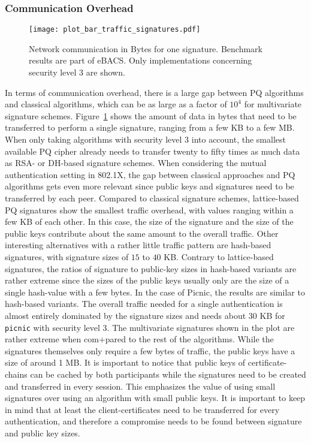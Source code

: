 \subsubsection{Communication Overhead}
\begin{figure}[ht]
    \centering\texttt{[image: plot\_bar\_traffic\_signatures.pdf]}
    \caption{Network communication in Bytes for one signature. Benchmark results are part of eBACS\cite{eBACS}. Only implementations concerning security level 3 are shown.}\label{fig:pq_sig_traffic}
\end{figure}

In terms of communication overhead, there is a large gap between \ac{PQ} algorithms and classical algorithms, which can be as large as a factor of \(10^4\) for multivariate signature schemes. Figure~\ref{fig:pq_sig_traffic} shows the amount of data in bytes that need to be transferred to perform a single signature, ranging from a few KB to a few MB. When only taking algorithms with security level 3 into account, the smallest available \ac{PQ} cipher already needs to transfer twenty to fifty times as much data as RSA- or \ac{DH}-based signature schemes. When considering the mutual authentication setting in 802.1X, the gap between classical approaches and \ac{PQ} algorithms gets even more relevant since public keys and signatures need to be transferred by each peer. Compared to classical signature schemes, lattice-based \ac{PQ} signatures show the smallest traffic overhead, with values ranging within a few KB of each other. In this case, the size of the signature and the size of the public keys contribute about the same amount to the overall traffic. Other interesting alternatives with a rather little traffic pattern are hash-based signatures, with signature sizes of \(15\) to \(40\) KB. Contrary to lattice-based signatures, the ratios of signature to public-key sizes in hash-based variants are rather extreme since the sizes of the public keys usually only are the size of a single hash-value with a few bytes. In the case of Picnic, the results are similar to hash-based variants. The overall traffic needed for a single authentication is almost entirely dominated by the signature sizes and needs about 30 KB for \texttt{picnic} with security level 3. The multivariate signatures shown in the plot are rather extreme when com+pared to the rest of the algorithms. While the signatures themselves only require a few bytes of traffic, the public keys have a size of around 1 MB. It is important to notice that public keys of certificate-chains can be cached by both participants while the signatures need to be created and transferred in every session. This emphasizes the value of using small signatures over using an algorithm with small public keys. It is important to keep in mind that at least the client-certificates need to be transferred for every authentication, and therefore a compromise needs to be found between signature and public key sizes.


